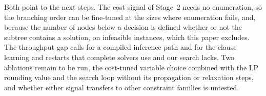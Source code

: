 \documentclass[final,5p,times,twocolumn,authoryear]{elsarticle}
\begin{document}
Both point to the next steps. The cost signal of Stage~2 needs no enumeration, so the branching order can be fine-tuned at the sizes where enumeration fails, and, because the number of nodes below a decision is defined whether or not the subtree contains a solution, on infeasible instances, which this paper excludes. The throughput gap calls for a compiled inference path and for the clause learning and restarts that complete solvers use and our search lacks. Two ablations remain to be run, the cost-tuned variable choice combined with the LP rounding value and the search loop without its propagation or relaxation steps, and whether either signal transfers to other constraint families is untested.



\end{document}
